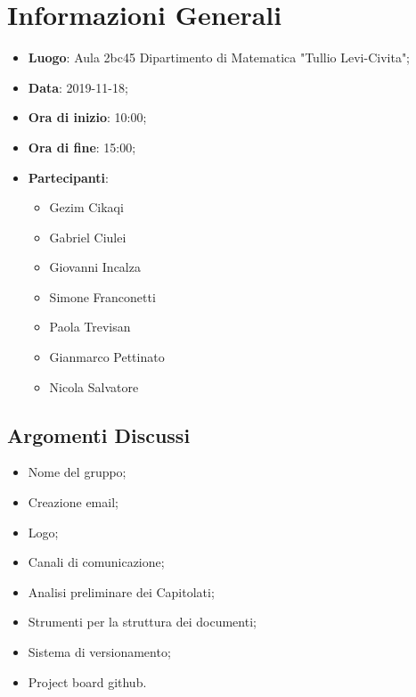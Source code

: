 \section{Informazioni Generali}
	\begin{itemize}
		\item \textbf {Luogo}: Aula 2bc45 Dipartimento di Matematica "Tullio Levi-Civita";
		\item \textbf {Data}: 2019-11-18;
		\item \textbf {Ora di inizio}: 10:00;
		\item \textbf {Ora di fine}: 15:00;
		\item \textbf {Partecipanti}: 
			\begin{itemize}
				\item Gezim Cikaqi
				\item Gabriel Ciulei
				\item Giovanni Incalza
				\item Simone Franconetti
				\item Paola Trevisan
				\item Gianmarco Pettinato
				\item Nicola Salvatore
			\end{itemize}
	\end{itemize}
\subsection{Argomenti Discussi}
	\begin{itemize}
		\item Nome del gruppo;
		\item Creazione email;
		\item Logo;
		\item Canali di comunicazione;
		\item Analisi preliminare dei Capitolati\glos;
		\item Strumenti per la struttura dei documenti;
		\item Sistema di versionamento;
		\item Project board github.
	\end{itemize}